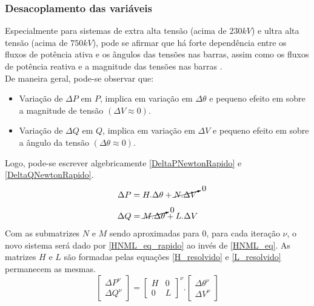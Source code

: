\subsubsection{Desacoplamento das variáveis}
\label{SubsectionMetodoNewtonDesacopladoVariaveis}
Especialmente para sistemas de extra alta tensão (acima de $230kV$) e ultra alta tensão (acima de $750kV$), pode se afirmar que há forte dependência entre os fluxos de potência ativa e os ângulos das tensões nas barras, assim como os fluxos de potência reativa e a magnitude das tensões nas barras \cite{fpdr}.\\
De maneira geral, pode-se observar que:
\begin{itemize}
    \item Variação de $\Delta P$ em $P$, implica em variação em $\Delta \theta$ e pequeno efeito em sobre a magnitude de tensão $(\Delta V \approx 0)$.
    \item Variação de $\Delta Q$ em $Q$, implica em variação em $\Delta V$ e pequeno efeito em sobre a ângulo da tensão $(\Delta \theta \approx 0)$.
\end{itemize}
Logo, pode-se escrever algebricamente \ref{DeltaPNewtonRapido} e \ref{DeltaQNewtonRapido}.
\begin{equation}
    \Delta P = H.\Delta\theta + \cancelto{0}{N.\Delta V} 
    \label{DeltaPNewtonRapido}
\end{equation}
\begin{equation}
    \Delta Q = \cancelto{0}{M.\Delta \theta} + L.\Delta V
    \label{DeltaQNewtonRapido}
\end{equation}
Com as submatrizes $N$ e $M$ sendo aproximadas para 0, para cada iteração $\nu$, o novo sistema será dado por \ref{HNML_eq_rapido} ao invés de \ref{HNML_eq}. As matrizes $H$ e $L$ são formadas pelas equações \ref{H_resolvido} e \ref{L_resolvido} permanecem as mesmas.
\begin{equation}
    \left[ \begin{matrix} \Delta P^\nu \\ \Delta Q^\nu  \end{matrix} \right]  = \left[ \begin{matrix} H & 0 \\ 0 & L  \end{matrix} \right]^\nu . \left[ \begin{matrix} \Delta \theta^\nu \\ \Delta V^\nu  \end{matrix} \right] 
    \label{HNML_eq_rapido}
\end{equation}

